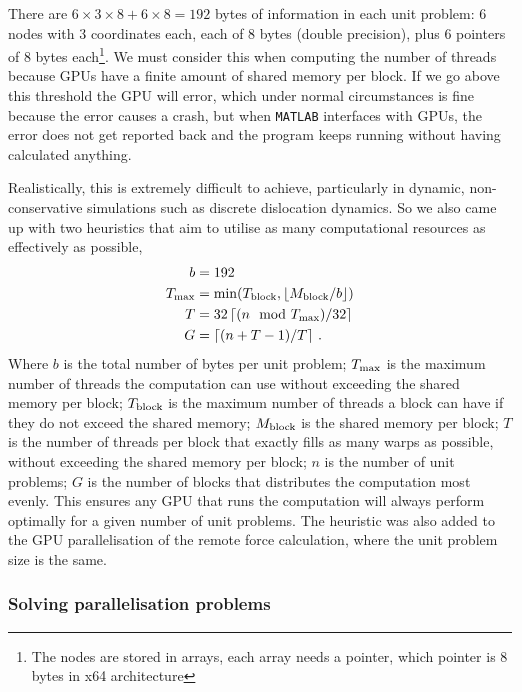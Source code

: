 There are $6\times 3\times 8 + 6\times 8 = 192$ bytes of information in each unit problem: 6 nodes with 3 coordinates each, each of 8 bytes (double precision), plus 6 pointers of 8 bytes each\footnote{The nodes are stored in arrays, each array needs a pointer, which pointer is 8 bytes in x64 architecture}. We must consider this when computing the number of threads because GPUs have a finite amount of shared memory per block. If we go above this threshold the GPU will error, which under normal circumstances is fine because the error causes a crash, but when \texttt{MATLAB} interfaces with GPUs, the error does not get reported back and the program keeps running without having calculated anything.

Realistically, this is extremely difficult to achieve, particularly in dynamic, non-conservative simulations such as discrete dislocation dynamics. So we also came up with two heuristics that aim to utilise as many computational resources as effectively as possible,
\begin{align}\label{eq:numThreads}
  b            & = 192                                                               \\
  T_{\textrm{max}} & = \min(T_{\textrm{block}}, \left\lfloor M_{\textrm{block}}/b \right\rfloor) \\
  T            & = 32 \left\lceil (n \mod{T_{\textrm{max}}})/32 \right\rceil           \\
  G            & = \left\lceil (n + T - 1) / T \right\rceil\,.
\end{align}
Where $b$ is the total number of bytes per unit problem; $T_{\textrm{max}}$ is the maximum number of threads the computation can use without exceeding the shared memory per block; $T_{\textrm{block}}$ is the maximum number of threads a block can have if they do not exceed the shared memory; $M_{\textrm{block}}$ is the shared memory per block; $T$ is the number of threads per block that exactly fills as many warps as possible, without exceeding the shared memory per block; $n$ is the number of unit problems; $G$ is the number of blocks that distributes the computation most evenly. This ensures any GPU that runs the computation will always perform optimally for a given number of unit problems. The heuristic was also added to the GPU parallelisation of the remote force calculation, where the unit problem size is the same.

\subsubsection{Solving parallelisation problems}

